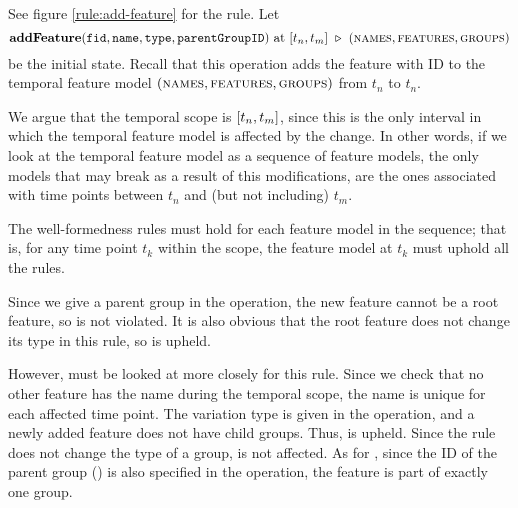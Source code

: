 See figure \vref{rule:add-feature} for the  rule.
Let 
\[ \textbf{addFeature}(\var{fid}, \var{name}, \var{type}, \var{parentGroupID})\text{ at }\interval{t_n}{t_m}
\shove (\names{}, \features{}, \groups{})
\]
be the initial state. Recall that this operation adds the feature with ID  to the temporal feature model $(\textsc{names}{}, \textsc{features}{}, \textsc{groups}{}{})$ from $t_n$ to $t_n$.

We argue that the temporal scope is $\interval{t_n}{t_m}$, since this is the only interval in which the temporal feature model is affected by the change. In other words, if we look at the temporal feature model as a sequence of feature models, the only models that may break as a result of this modifications, are the ones associated with time points between $t_n$ and (but not including) $t_m$. 

The well-formedness rules must hold for each feature model in the sequence; that is, for any time point $t_k$ within the scope, the feature model at $t_k$ must uphold all the rules. 

Since we give a parent group in the operation, the new feature cannot be a root feature, so  is not violated. It is also obvious that the root feature does not change its type in this rule, so  is upheld. 

However,  must be looked at more closely for this rule. Since we check that no other feature has the name  during the temporal scope, the name is unique for each affected time point. The variation type is given in the operation, and a newly added feature does not have child groups. Thus,  is upheld. Since the rule does not change the type of a group,  is not affected. As for , since the ID of the parent group () is also specified in the operation, the feature is part of exactly one group. 

